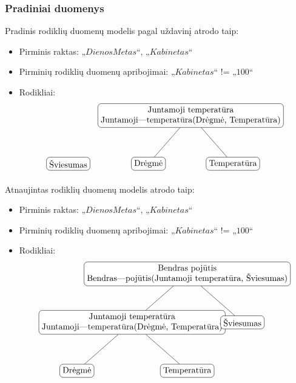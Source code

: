 \documentclass{VUMIFPSbakalaurinis}
\begin{document}
\subsubsection{Pradiniai duomenys}
\noindent Pradinis rodiklių duomenų modelis pagal uždavinį atrodo taip:
\begin{itemize}
    \item Pirminis raktas: \(\textit{„DienosMetas“, „Kabinetas“}\)
    \item Pirminių rodiklių duomenų apribojimai: \(\textit{„Kabinetas“ != „100“}\) 
    \item Rodikliai:
    \[
        \begin{tikzpicture}[sibling distance=10em,
            level distance=2cm,
            every node/.style = {shape=rectangle, rounded corners,	
                                draw, align=center,	
                                top color=white, bottom color=white}]	
            \node{Šviesumas}; 	
        \end{tikzpicture}\>\>\>\>
        \begin{tikzpicture}[sibling distance=10em,
            level distance=2cm,
            every node/.style = {shape=rectangle, rounded corners,	
                                draw, align=center,	
                                top color=white, bottom color=white}]	
            \node{Juntamoji temperatūra\\Juntamoji—temperatūra(Drėgmė, Temperatūra)}
                    child { node {Drėgmė} }	
                    child { node {Temperatūra} } ; 	
        \end{tikzpicture} 	
    \]
\end{itemize}
Atnaujintas rodiklių duomenų modelis atrodo taip:
\begin{itemize}
    \item Pirminis raktas: \(\textit{„DienosMetas“, „Kabinetas“}\)
    \item Pirminių rodiklių duomenų apribojimai: \(\textit{„Kabinetas“ != „100“}\) 
    \item Rodikliai:
    \[	
        \begin{tikzpicture}[sibling distance=13em,
            level distance=2cm,
            every node/.style = {shape=rectangle, rounded corners,	
                                draw, align=center,	
                                top color=white, bottom color=white}]	
            \node{ Bendras pojūtis \\Bendras—pojūtis(Juntamoji temperatūra, Šviesumas)}
                child{ node {Juntamoji temperatūra\\Juntamoji—temperatūra(Drėgmė, Temperatūra)}
                        child { node {Drėgmė} }	
                        child { node {Temperatūra} } }
                child {node {Šviesumas}}; 	
        \end{tikzpicture} 	
    \]
\end{itemize}
\end{document}
